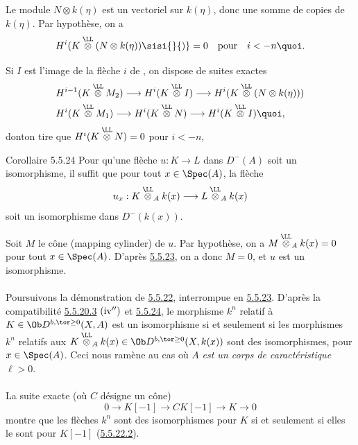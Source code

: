 Le module $N\otimes k(\eta)$ est un vectoriel sur $k(\eta)$, donc une
somme de copies de $k(\eta)$. Par hypothèse, on a
$$
H^{i}(K\overset{\LL}{\otimes} (N\otimes
k(\eta))\sisi{}{)}=0\quad\mbox{\rm pour}\quad i<-n{\quoi}.
$$

Si $I$ est l'image de la flèche $i$ de , on dispose de
suites exactes
\begin{align*}
& H^{i-1}(K\overset{\LL}{\otimes}M_{2})\longrightarrow
H^{i}(K\overset{\LL}{\otimes}I)\longrightarrow
H^{i}(K\overset{\LL}{\otimes}(N\otimes k(\eta)))\\
& H^{i}(K\overset{\LL}{\otimes}M_{1})\longrightarrow
H^{i}(K\overset{\LL}{\otimes}N)\longrightarrow
H^{i}(K\overset{\LL}{\otimes}I){\quoi},
\end{align*}
dont\pageoriginale on tire que
$H^{i}(K\overset{\LL}{\otimes}N)=0$ pour $i<-n$,
\cqfd

\begin{enonce*}{Corollaire 5.5.24}
Pour qu'une flèche $u:K\rightarrow L$ dans $D^{-}(A)$ soit un
isomorphisme, il suffit que pour tout $x\in \Spec(A)$, la flèche
$$
u_{x}:K\overset{\LL}{\otimes}_{A}k(x)\longrightarrow
L\overset{\LL}{\otimes}_{A}k(x)
$$
soit un isomorphisme dans $D^{-}(k(x))$.
\end{enonce*}

\sisi{\noindent}{}Soit $M$ le cône (mapping cylinder) de $u$. Par hypothèse, on a
$M\overset{\LL}{\otimes}_{A}k(x)=0$ pour tout
$x\in\Spec(A)$. D'après \hyperref[XVII.prop5.5.23]{5.5.23}, on a donc $M=0$, et $u$ est un
isomorphisme.

\setcounter{subsubsection}{25}
\setcounter{paragraph}{0}
\paragraph{}
Poursuivons la démonstration de \hyperref[XVII.lem5.5.22]{5.5.22}, interrompue
en \hyperref[XVII.prop5.5.23]{5.5.23}. D'après
la compatibilité \hyperref[XVII.par5.5.20.3]{5.5.20.3} ${\rm(iv'')}$ et
\hyperref[XVII.cor5.5.24]{5.5.24}, le morphisme $k^{n}$
relatif à $K\in \Ob D^{b,\tor\geq 0}(X,A)$ est un isomorphisme si et
seulement si les morphismes $k^{n}$ relatifs aux
$K\overset{\LL}{\otimes}_{A}k(x)\in \Ob
D^{b,\tor\geq 0}(X,k(x))$ sont des isomorphismes, pour $x\in
\Spec(A)$. Ceci nous ramène au cas où $A$ \emph{est un corps de
caractéristique} $\ell > 0$.

\paragraph{}
La suite exacte (où $C$ désigne un cône)
$$
0\longrightarrow K[-1]\longrightarrow CK[-1]\longrightarrow
K\longrightarrow 0
$$
montre que les flèches $k^{n}$ sont des isomorphismes pour $K$ si et
seulement si elles le sont pour $K[-1]$ (\hyperref[XVII.lem5.5.22.2]{5.5.22.2}).

